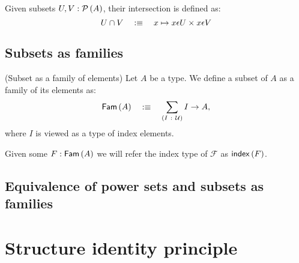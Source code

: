 \begin{defn}\label{defn:set-intersection}
  Given subsets $U, V : \mathcal{P}\left(A\right)$, their intersection is defined as:
  \begin{equation*}
    U \cap V \quad:\equiv\quad x \mapsto x \epsilon U \times x \epsilon V
  \end{equation*}
\end{defn}

\subsection{Subsets as families}

\begin{defn}(Subset as a family of elements)\label{defn:fam}
  Let $A$ be a type. We define a subset of $A$ as a family of its elements as:
  \begin{equation*}
    \mathsf{Fam}\left(A\right) \quad:\equiv\quad \sum_{(I~:~\mathcal{U})} I \rightarrow A,
  \end{equation*}
  where $I$ is viewed as a type of index elements.

  Given some $F : \mathsf{Fam}\left(A\right)$ we will refer the index type of $\mathcal{F}$ as
  $\mathsf{index}{}\left(F\right)$.
\end{defn}

\subsection{Equivalence of power sets and subsets as families}


\section{Structure identity principle}\label{sec:sip}
